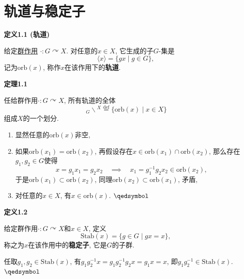 \documentclass[UTF8]{ctexart}
\begin{document}
\setlength{\abovedisplayskip}{1pt}
\setlength{\belowdisplayskip}{1pt}

\section{轨道与稳定子}

\hypertarget{sec:定义1.1}{}
\noindent\textbf{定义1.1 (轨道)}

给定\href{01 群作用与 G-集#nameddest=sec:定义1.1}{群作用}
$\cdot:G\curvearrowright X$. 对任意的$x\in X$, 它生成的子$G$-集是
\[
    \langle x\rangle=\{gx\mid g\in G\},
\]
记为$\mathrm{orb}(x)$, 称作$x$在该作用下的\textbf{轨道}.

\vspace{10pt}

\hypertarget{sec:定理1.1}{}
\noindent\textbf{定理1.1}

任给群作用$\cdot:G\curvearrowright X$, 所有轨道的全体
\[
    \,_{\displaystyle G}\backslash\!^{\displaystyle X}
    \overset{\mathrm{def}}{=}\{\mathrm{orb}(x)\mid x\in X\}
\]
组成$X$的一个划分.


\begin{enumerate}
    \item 显然任意的$\mathrm{orb}(x)$非空,
    \item 如果$\mathrm{orb}(x_1)=\mathrm{orb}(x_2)$,
    再假设存在$x\in\mathrm{orb}(x_1)\cap\mathrm{orb}(x_2)$,
    那么存在$g_1,g_2\in G$使得
    \[
        x=g_1x_1=g_2x_2\quad\implies\quad x_1=g_1^{-1}g_2x_2\in\mathrm{orb}(x_2),
    \]
    于是$\mathrm{orb}(x_1)\subset\mathrm{orb}(x_2)$,
    同理$\mathrm{orb}(x_2)\subset\mathrm{orb}(x_1)$, 矛盾,
    \item 对任意的$x\in X$, 有$x\in\mathrm{orb}(x)$. \hfill $\qedsymbol$
\end{enumerate}

\vspace{10pt}

\hypertarget{sec:定义1.2}{}
\noindent\textbf{定义1.2}

给定群作用$\cdot:G\curvearrowright X$和$x\in X$, 定义
\[
    \mathrm{Stab}(x)=\{g\in G\mid gx=x\},
\]
称之为$x$在该作用中的\textbf{稳定子}, 它是$G$的子群.


任取$g_1,g_2\in\mathrm{Stab}(x)$, 有$g_1g_2^{-1}x=g_1g_2^{-1}g_2x=g_1x=x$,
即$g_1g_2^{-1}\in\mathrm{Stab}(x)$. \hfill $\qedsymbol$

\vspace{10pt}
\end{document}
